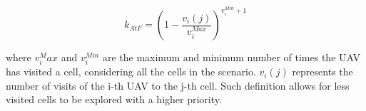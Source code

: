 \begin{equation}
	k_{AtF} = \left( 1 - \frac{v_i(j)}{v_i^{Max}} \right) ^ {v_i^{Min} + 1}
\end{equation}

where $v_i^Max$ and $v_i^{Min}$ are the maximum and minimum number of times the \gls{UAV} has visited a cell, considering all the cells in the scenario. $v_i(j)$ represents the number of visits of the i-th \gls{UAV} to the j-th cell. Such definition allows for less visited cells to be explored with a higher priority.


















